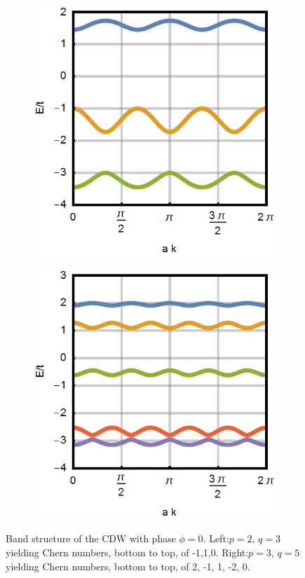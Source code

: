 \documentclass[letterpaper, 10 pt, conference]{ieeeconf}  %
\begin{document}
\begin{figure}[tbph]
\begin{subfigure}{.49\linewidth}
\centering
\includegraphics{bandstructure_p=2_q=3.png}
\end{subfigure}
\begin{subfigure}{.49\linewidth}
\centering
\includegraphics{bandstructure_p=3_q=5.png}
\end{subfigure}
\caption{Band structure of the CDW with phase $\phi = 0$.
Left:$p = 2$, $q = 3$ yielding Chern numbers, bottom to top, of -1,1,0.
Right:$p = 3$, $q = 5$ yielding Chern numbers, bottom to top, of 2, -1, 1, -2, 0.
\label{fig:bandstructure} }

\end{figure}
\end{document}
